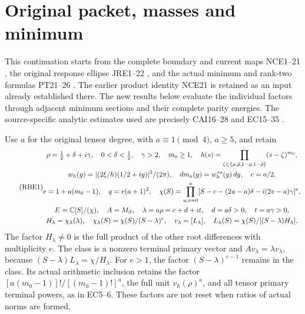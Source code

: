 \documentclass[11pt,a4paper]{article}
\begin{document}
\section{Original packet, masses and minimum}

This continuation starts from the complete boundary and current maps
NCE1--21 \cite{a04rbe:nce}, the original response ellipse JRE1--22
\cite{a04rbe:jre}, and the actual minimum and rank-two formulas PT21--26
\cite{a04rbe:pt}. The earlier product identity NCE21 is retained as an
input already established there. The new results below evaluate the
individual factors through adjacent minimum sections and their
complete parity energies. The source-specific analytic estimates used
are precisely CAI16--28 \cite{a04rbe:cai} and EC15--35 \cite{a04rbe:ec}.

Use \(a\) for the original tensor degree, with
\(a\equiv1\pmod4\), \(a\ge5\), and retain
\begin{equation}\tag{RBE1}
\begin{gathered}
 \rho=\tfrac12+\delta+i\gamma,\quad0<\delta<\tfrac12,\quad
 \gamma>2,\quad m_0\ge1,\quad
 h(s)=\prod_{\zeta\in\{\rho,\bar\rho,1-\rho,1-\bar\rho\}}
                       (s-\zeta)^{m_0},\\
 w_h(y)=|(2\xi/h)(1/2+iy)|^2/(2\pi),\quad
 dm_a(y)=w_h^{*a}(y)\,dy,\quad c=a/2,\\
 e=1+a(m_0-1),\quad q=e(a+1)^2,\quad
 \chi(S)=\prod_{u,v=0}^a
 [S-c-(2u-a)\delta-i(2v-a)\gamma]^e,\\
 E=\mathbb C[S]/(\chi),\quad A=M_S,\quad
 \lambda=a\rho=c+d+it,\quad d=a\delta>0,\quad t=a\gamma>0,\\
 H_\lambda=\chi_\lambda(\lambda),\quad
 \chi_\lambda(S)=\chi(S)/(S-\lambda)^e,\quad
 v_\lambda=[L_\lambda],\quad
 L_\lambda(S)=\chi(S)/[(S-\lambda)H_\lambda].
\end{gathered}
\end{equation}
The factor \(H_\lambda\ne0\) is the full product of the other
root differences with multiplicity \(e\). The class is a nonzero
terminal primary vector and \(Av_\lambda=\lambda v_\lambda\),
because \((S-\lambda)L_\lambda=\chi/H_\lambda\).
For \(e>1\), the factor \((S-\lambda)^{e-1}\) remains in
the class. Its actual arithmetic inclusion retains the factor
\([a(m_0-1)]!/[(m_0-1)!]^a\), the full unit \(v_h(\rho)^a\),
and all tensor primary terminal powers, as in EC5--6. These factors
are not reset when ratios of actual norms are formed.
\end{document}
